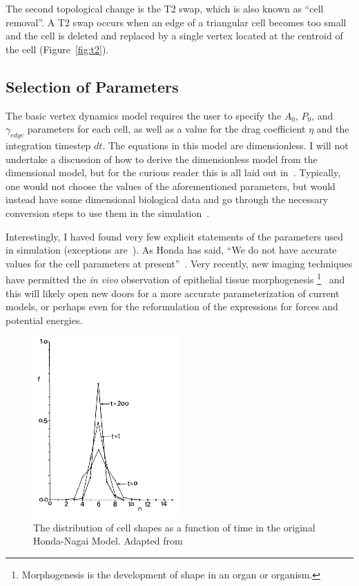 The second topological change is the T2 swap, which is also known as ``cell removal''. A T2 swap occurs when an edge of a triangular cell becomes too small and the cell is deleted and replaced by a single vertex located at the centroid of the cell (Figure~\ref{fig:t2}).

\subsection{Selection of Parameters}
The basic vertex dynamics model requires the user to specify the $A_0$, $P_0$, and $\gamma_{edge}$ parameters for each cell, as well as a value for the drag coefficient $\eta$ and the integration timestep $dt$. The equations in this model are dimensionless. I will not undertake a discussion of how to derive the dimensionless model from the dimensional model, but for the curious reader this is all laid out in~\cite{HondaNagai}. Typically, one would not choose the values of the aforementioned parameters, but would instead have some dimensional biological data and go through the necessary conversion steps to use them in the simulation~\cite{NewOkuda}.

Interestingly, I haved found very few explicit statements of the parameters used in simulation (exceptions are~\cite{WoundHealing, ChasteMain, NewOkuda}). As Honda has said, ``We do not have accurate values for the cell parameters at present''~\cite{Honda3D}.  Very recently, new imaging techniques have permitted the \emph{in vivo} observation of epithelial tissue morphogenesis \footnote{Morphogenesis is the development of shape in an organ or organism.}~\cite{Sokolow, Xiong} and this will likely open new doors for a more accurate parameterization of current models, or perhaps even for the reformulation of the expressions for forces and potential energies. 

\begin{figure}[ht]
\centering
\includegraphics[width=0.5\textwidth]{../diagrams/distibutionHonda.png}
\caption[Distribution of Cell Shapes]{The distribution of cell shapes as a function of time in the original Honda-Nagai Model. Adapted from~\cite{HondaNagai}}
\label{fig:hnm}
\end{figure}


